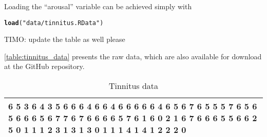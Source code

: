 \documentclass[bimj,fleqn]{w-art}\usepackage[]{graphicx}\usepackage[]{color}
\makeatletter
\newcommand{\hlstr}[1]{\textcolor[rgb]{0.192,0.494,0.8}{#1}}%
\newcommand{\hlstd}[1]{\textcolor[rgb]{0.345,0.345,0.345}{#1}}%
\newcommand{\hlkwd}[1]{\textcolor[rgb]{0.737,0.353,0.396}{\textbf{#1}}}%
\newenvironment{kframe}{%
 \def\at@end@of@kframe{}%
 \ifinner\ifhmode%
  \def\at@end@of@kframe{\end{minipage}}%
  \begin{minipage}{\columnwidth}%
 \fi\fi%
 \def\FrameCommand##1{\hskip\@totalleftmargin \hskip-\fboxsep
 \colorbox{shadecolor}{##1}\hskip-\fboxsep
     \hskip-\linewidth \hskip-\@totalleftmargin \hskip\columnwidth}%
 \MakeFramed {\advance\hsize-\width
   \@totalleftmargin\z@ \linewidth\hsize
   \@setminipage}}%
 {\par\unskip\endMakeFramed%
 \at@end@of@kframe}
\newenvironment{knitrout}{}{} %
\theoremstyle{plain}
\theoremstyle{definition}
\makeatother
\begin{document}
\begin{enumerate}
Loading the ``arousal'' variable can be achieved simply with
\begin{knitrout}
\color{fgcolor}\begin{kframe}
\begin{alltt}
\hlkwd{load}\hlstd{(}\hlstr{"data/tinnitus.RData"}\hlstd{)}
\end{alltt}
\end{kframe}
\end{knitrout}

TIMO: update the table as well please

\autoref{table:tinnitus_data} presents the raw data, which are also available for download at the GitHub repository.

\bigskip

\begin{table}[ht]
\centering
\begin{tabular}{p{15cm}}
   \hline
6 5 3 6 4 3 5 6 6 6 4 6 6 4 6 6 6 6 6 4 6 5 6 7 6 5 5 5 7 6 5 6 5 6 6 6 5 6 7 7 6 7 6 6 6 6 5 7 6 1 6 0 2 1 6 7 6 6 6 5 5 6 6 2 5 0 1 1 1 2 3 1 3 1 3 0 1 1 1 4 1 4 1 2 2 2 0 \\ 
   \hline
\end{tabular}
\caption{Tinnitus data} 
\label{table:tinnitus_data}
\end{table}



\end{enumerate}
\end{document}
